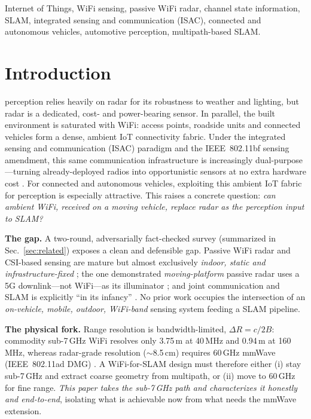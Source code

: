 \documentclass[journal]{IEEEtran}
\newcommand{\SI}[2]{#1\,#2}
\begin{document}
\begin{IEEEkeywords}
Internet of Things, WiFi sensing, passive WiFi radar, channel state information,
SLAM, integrated sensing and communication (ISAC), connected and autonomous
vehicles, automotive perception, multipath-based SLAM.
\end{IEEEkeywords}

\section{Introduction}
 perception relies heavily on radar for its robustness
to weather and lighting, but radar is a dedicated, cost- and power-bearing sensor.
In parallel, the built environment is saturated with WiFi: access points, roadside
units and connected vehicles form a dense, ambient IoT connectivity fabric. Under
the integrated sensing and communication (ISAC) paradigm and the IEEE~802.11bf
sensing amendment, this same communication infrastructure is increasingly
dual-purpose---turning already-deployed radios into opportunistic sensors at no
extra hardware cost \cite{overview2024ieee80211bf,liu2022isac,zhang2021jcassurvey}.
For connected and autonomous vehicles, exploiting this ambient IoT fabric for
perception is especially attractive. This raises a concrete question: \emph{can
ambient WiFi, received on a moving vehicle, replace radar as the perception input
to SLAM?}

\textbf{The gap.} A two-round, adversarially fact-checked survey (summarized in
Sec.~\ref{sec:related}) exposes a clean and defensible gap. Passive WiFi radar and
CSI-based sensing are mature but almost exclusively \emph{indoor, static and
infrastructure-fixed}
\cite{chetty2012ttwifi,yildirim2021superres,li2021standalone,yan2024personinwifi3d};
the one demonstrated \emph{moving-platform} passive radar uses a 5G downlink---not
WiFi---as its illuminator \cite{maksymiuk2024movingpr}; and joint communication
and SLAM is explicitly ``in its infancy'' \cite{gounis2026slamcomms}. No prior work
occupies the intersection of an \emph{on-vehicle, mobile, outdoor, WiFi-band}
sensing system feeding a SLAM pipeline.

\textbf{The physical fork.} Range resolution is bandwidth-limited,
$\Delta R = c/2B$: commodity sub-\SI{7}{GHz} WiFi resolves only
\SI{3.75}{m} at \SI{40}{MHz} and \SI{0.94}{m} at \SI{160}{MHz}, whereas radar-grade
resolution (\(\sim\)\SI{8.5}{cm}) requires \SI{60}{GHz} mmWave (IEEE~802.11ad DMG)
\cite{kumari2018adradar,overview2024ieee80211bf}. A WiFi-for-SLAM design must
therefore either (i) stay sub-\SI{7}{GHz} and extract coarse geometry from
multipath, or (ii) move to \SI{60}{GHz} for fine range. \emph{This paper takes the
sub-\SI{7}{GHz} path and characterizes it honestly and end-to-end}, isolating what
is achievable now from what needs the mmWave extension.
\end{document}
